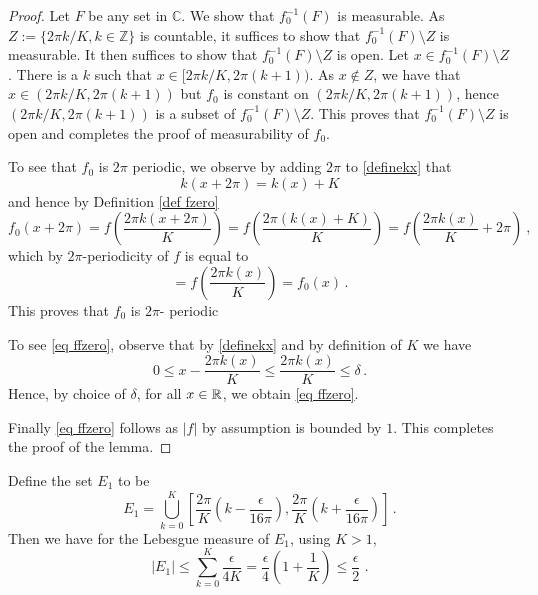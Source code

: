 {\begin{proof}
Let $F$ be any set in $\mathbb{C}$. We show that
$f_0^{-1}(F)$ is measurable. As
$Z:=\{2\pi k/K, k\in \mathbb{Z}\}$ is countable, it suffices to show
that $f_0^{-1}(F)\setminus Z$ is measurable. It then
suffices to show that $f_0^{-1}(F)\setminus Z$ is open.
Let $x\in f_0^{-1}(F)\setminus Z$. There is a $k$
such that $x\in [2\pi k/K, 2\pi (k+1))$. As $x\not\in Z$,
we have that $x\in (2\pi k/K, 2\pi (k+1))$
but $f_0$ is constant on $(2\pi k/K, 2\pi (k+1))$,
hence $(2\pi k/K, 2\pi (k+1))$ is a subset of
$f_0^{-1}(F)\setminus Z$. This proves that
$f_0^{-1}(F)\setminus Z$ is open and completes the proof of measurability of $f_0$.




To see that $f_0$ is $2\pi$ periodic, we observe by
adding $2\pi$ to \eqref{definekx} that
\begin{equation}
 k(x+2\pi)=k(x)+K
\end{equation}
and hence by Definition \eqref{def fzero}
\begin{equation}
    f_0(x+2\pi)=f(\frac {2\pi k(x+2\pi)}K)=f(\frac{2\pi (k(x)+K)}{K})
     =f(\frac{2\pi k(x)}K+2\pi)\ ,
\end{equation}
which by $2\pi$-periodicity of $f$ is equal to
\begin{equation}
   =f(\frac{2\pi k(x)}K)=f_0(x)\, .
\end{equation}
  This proves that $f_0$ is $2\pi$- periodic




To see \eqref{eq ffzero}, observe that by \eqref{definekx} and by definition of $K$ we have
\begin{equation}
0\le x-\frac{2\pi k(x)}{K} \le \frac{2\pi k(x)}{K}\le \delta\, .
\end{equation}
Hence, by choice of $\delta$, for all $x\in \mathbb{R}$, we obtain \eqref{eq ffzero}.

Finally \eqref{eq ffzero} follows as $|f|$ by assumption is bounded by $1$.
This completes the proof of the lemma.
\end{proof}

Define the set $E_1$ to be
\begin{equation}
E_1=\bigcup_{k=0}^{K}[\frac{2\pi}K (k-\frac {\epsilon}{16\pi }),
\frac{2\pi}K (k+\frac {\epsilon}{16\pi})]\, .
\end{equation}
Then we have for the Lebesgue measure of $E_1$, using $K>1$,
\begin{equation}
 |E_1|\le \sum_{k=0}^{K}\frac {\epsilon}{4K}= \frac{\epsilon}{4}\left(1+\frac 1K\right)\le \frac \epsilon 2\, \, .
\end{equation}

}
